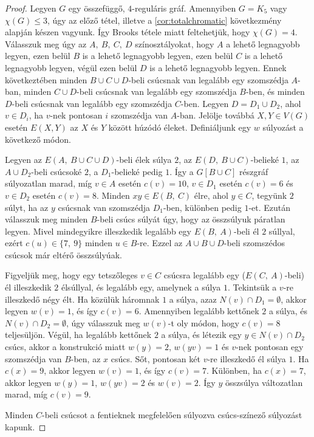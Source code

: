 \documentclass[12pt, a4paper]{report}
\theoremstyle{remark}
\theoremstyle{definition}
\begin{document}
\begin{proof}
Legyen $G$ egy összefüggő, $4$-reguláris gráf. Amennyiben $G = K_5$ vagy $\chi(G) \leq 3$, úgy az előző tétel, illetve a \ref{cor:totalchromatic} következmény alapján készen vagyunk. Így Brooks tétele miatt feltehetjük, hogy $\chi(G) = 4$. Válasszuk meg úgy az $A,\ B,\ C,\ D$ színosztályokat, hogy $A$ a lehető legnagyobb legyen, ezen belül $B$ is a lehető legnagyobb legyen, ezen belül $C$ is a lehető legnagyobb legyen, végül ezen belül $D$ is a lehető legnagyobb legyen. Ennek következtében minden $B \cup C \cup D$-beli csúcsnak van legalább egy szomszédja $A$-ban, minden $C \cup D$-beli csúcsnak van legalább egy szomszédja $B$-ben, és minden $D$-beli csúcsnak van legalább egy szomszédja $C$-ben. Legyen $D = D_1 \cup D_2$, ahol $v \in D_i$, ha $v$-nek pontosan $i$ szomszédja van $A$-ban. Jelölje továbbá $X, Y \in V(G)$ esetén $E(X, Y)$ az $X$ és $Y$ között húzódó éleket. Definiáljunk egy $w$ súlyozást a következő módon.

Legyen az $E(A,\ B \cup C \cup D)$-beli élek súlya $2$, az $E(D,\ B \cup C)$-belieké $1$, az $A \cup D_2$-beli csúcsoké $2$, a $D_1$-belieké pedig $1$. Így a $G[B \cup C]$ részgráf súlyozatlan marad, míg $v \in A$ esetén $c(v) = 10$, $v \in D_1$ esetén $c(v) = 6$ és $v \in D_2$ esetén $c(v) = 8$. Minden $xy \in E(B,\ C)$ élre, ahol $y \in C$, tegyünk $2$ súlyt, ha az $y$ csúcsnak van szomszédja $D_1$-ben, különben pedig $1$-et. Ezután válasszuk meg minden $B$-beli csúcs súlyát úgy, hogy az összsúlyuk páratlan legyen. Mivel mindegyikre illeszkedik legalább egy $E(B,\ A)$-beli él $2$ súllyal, ezért $c(u) \in \lbrace 7,\ 9 \rbrace$ minden $u \in B$-re. Ezzel az $A \cup B \cup D$-beli szomszédos csúcsok már eltérő összsúlyúak.

Figyeljük meg, hogy egy tetszőleges $v \in C$ csúcsra legalább egy ($E(C,\ A)$-beli) él illeszkedik $2$ élsúllyal, és legalább egy, amelynek a súlya $1$. Tekintsük a $v$-re illeszkedő négy élt. Ha közülük háromnak $1$ a súlya, azaz $N(v) \cap D_1 = \emptyset$, akkor legyen $w(v) = 1$, és így $c(v) = 6$. Amennyiben legalább kettőnek $2$ a súlya, és $N(v) \cap D_2 = \emptyset$, úgy válasszuk meg $w(v)$-t oly módon, hogy $c(v) = 8$ teljesüljön. Végül, ha legalább kettőnek $2$ a súlya, és létezik egy $y \in N(v) \cap D_2$ csúcs, akkor a konstrukció miatt $w(y) = 2$, $w(yv) = 1$ és $v$-nek pontosan egy szomszédja van $B$-ben, az $x$ csúcs. Sőt, pontosan két $v$-re illeszkedő él súlya $1$. Ha $c(x) = 9$, akkor legyen $w(v) = 1$, és így $c(v) = 7$. Különben, ha $c(x) = 7$, akkor legyen $w(y) = 1$, $w(yv) = 2$ és $w(v) = 2$. Így $y$ összsúlya változatlan marad, míg $c(v) = 9$.

Minden $C$-beli csúcsot a fentieknek megfelelően súlyozva csúcs-színező súlyozást kapunk.
\end{proof}
\end{document}
